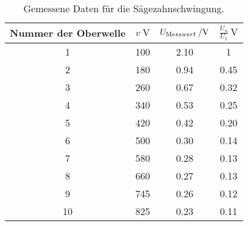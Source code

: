 \begin{table}[H]
  \centering
   \begin{tabular}{c c c c}
    \toprule
    Nummer der Oberwelle & $ v \: \si{\volt}$ & $ U_{\text Messwert}\: / \si{\volt} $ &
    $ \frac{U_{n}}{U_{1}} \: \si{\volt} $  \\
    \midrule
    1 & 100 & 2.10 & 1 \\
    2 & 180 & 0.94 & 0.45 \\
    3 & 260 & 0.67 & 0.32 \\
    4 & 340 & 0.53 & 0.25 \\
    5 & 420 & 0.42 & 0.20 \\
    6 & 500 & 0.30 & 0.14 \\
    7 & 580 & 0.28 & 0.13 \\
    8 & 660 & 0.27 & 0.13 \\
    9 & 745 & 0.26 & 0.12 \\
    10 & 825 & 0.23 & 0.11 \\
    \bottomrule
  \end{tabular}
  \caption{Gemessene Daten für die Sägezahnschwingung.}
  \label{tab:tabe3}
\end{table}

